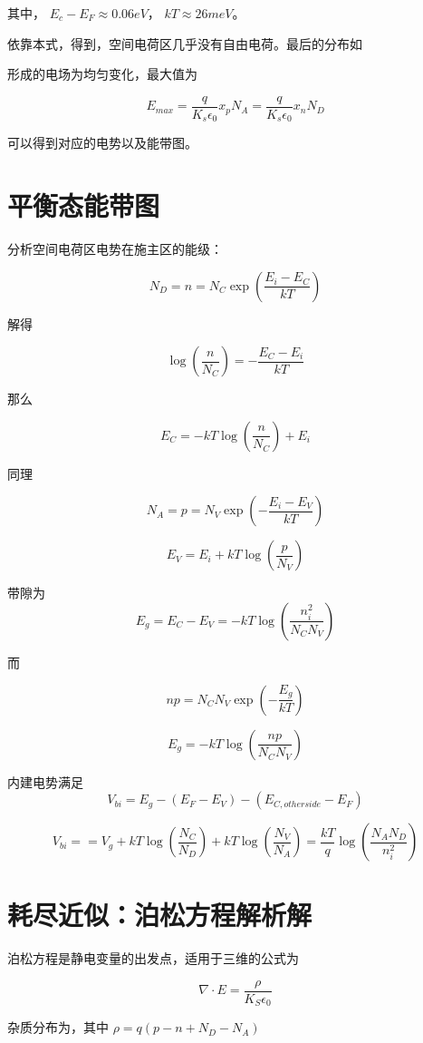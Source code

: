 \documentclass[cn,11pt,chinese,black,simple]{../elegantbook}
\begin{document}
其中， \(E_c - E_F \approx 0.06 eV\)， \(k T \approx 26 meV\)。

依靠本式，得到，空间电荷区几乎没有自由电荷。最后的分布如


形成的电场为均匀变化，最大值为 

\[E_{max} = \frac{q}{K_s \epsilon_0} x_p N_A = \frac{q}{K_s \epsilon_0} x_n N_D\]

可以得到对应的电势以及能带图。

\section{平衡态能带图}


分析空间电荷区电势在施主区的能级：

\[N_D = n = N_C \exp (\frac{E_i-E_C}{kT})\]

解得 

\[\log (\frac{n}{N_C}) = - \frac{E_C - E_i}{kT}\]

那么

\[E_C = - k T \log(\frac{n}{N_C}) + E_i\]

同理

\[N_A = p = N_V \exp (- \frac{E_i - E_V}{kT})\]

\[E_V = E_i + k T \log(\frac{p}{N_V}) \]

带隙为 \[E_g = E_C - E_V = - k T \log(\frac{n_i^2}{N_C N_V})\]

而 

\[np = N_C N_V \exp (- \frac{E_g}{kT})\]

\[E_g = -k T\log(\frac{np}{N_C N_V})\]

内建电势满足 \[V_{bi} = E_g - (E_F - E_V) - (E_{C,otherside} - E_F)\]

\[V_{bi} =  = V_g + kT\log(\frac{N_C}{N_D}) + kT \log (\frac{N_V}{N_A}) = \frac{kT}{q} \log(\frac{N_A N_D}{n_i^2})\]


\section{耗尽近似：泊松方程解析解}


泊松方程是静电变量的出发点，适用于三维的公式为

\[\nabla \cdot E = \frac{\rho}{K_S \epsilon_0}\]

杂质分布为，其中 \(\rho = q (p - n + N_D - N_A)\)
\end{document}
